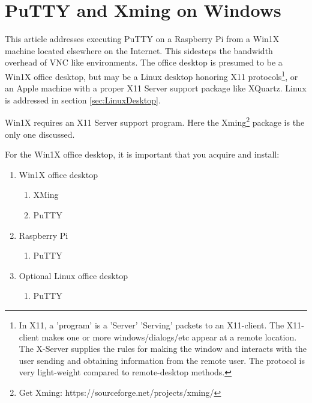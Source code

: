 
\section*{PuTTY and Xming on Windows} \label{sec:puttyxming}
\setcounter{section}{1}

This article addresses executing PuTTY on a Raspberry Pi from a Win1X
machine located elsewhere on the Internet. This sidesteps the
bandwidth overhead of VNC like environments.  The office desktop is
presumed to be a Win1X office desktop, but may be a Linux desktop
honoring X11 protocols\footnote{In X11, a 'program' is a 'Server'
  'Serving' packets to an X11-client. The X11-client makes one or more
  windows/dialogs/etc appear at a remote location. The X-Server
  supplies the rules for making the window and interacts with the user
  sending and obtaining information from the remote user. The protocol
  is very light-weight compared to remote-desktop methods.}, or an
Apple machine with a proper X11 Server support package like XQuartz.
Linux is addressed in section \ref{sec:LinuxDesktop}.

Win1X requires an X11 Server support program. Here the
Xming\footnote{Get Xming: https://sourceforge.net/projects/xming/} package is the
only one discussed.


For the Win1X office desktop, it is important that you acquire and install:
\vspace{-.15cm}
\begin{enumerate}\addtolength{\itemsep}{-0.5\baselineskip}
   \item   Win1X office desktop
\vspace{-.15cm}
\begin{enumerate}\addtolength{\itemsep}{-0.5\baselineskip}
   \item   XMing
   \item   PuTTY
\end{enumerate}
   \item   Raspberry Pi
\vspace{-.15cm}
\begin{enumerate}\addtolength{\itemsep}{-0.5\baselineskip}
   \item   PuTTY
\end{enumerate}
   \item   Optional Linux office desktop
\vspace{-.15cm}
\begin{enumerate}\addtolength{\itemsep}{-0.5\baselineskip}
   \item   PuTTY
\end{enumerate}
\end{enumerate}

